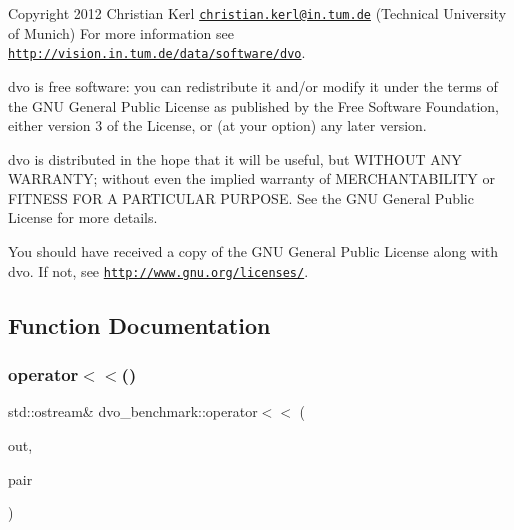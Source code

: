 Copyright 2012 Christian Kerl \href{mailto:christian.kerl@in.tum.de}{\tt christian.\+kerl@in.\+tum.\+de} (Technical University of Munich) For more information see \href{http://vision.in.tum.de/data/software/dvo}{\tt http\+://vision.\+in.\+tum.\+de/data/software/dvo}.

dvo is free software\+: you can redistribute it and/or modify it under the terms of the G\+NU General Public License as published by the Free Software Foundation, either version 3 of the License, or (at your option) any later version.

dvo is distributed in the hope that it will be useful, but W\+I\+T\+H\+O\+UT A\+NY W\+A\+R\+R\+A\+N\+TY; without even the implied warranty of M\+E\+R\+C\+H\+A\+N\+T\+A\+B\+I\+L\+I\+TY or F\+I\+T\+N\+E\+SS F\+OR A P\+A\+R\+T\+I\+C\+U\+L\+AR P\+U\+R\+P\+O\+SE. See the G\+NU General Public License for more details.

You should have received a copy of the G\+NU General Public License along with dvo. If not, see \href{http://www.gnu.org/licenses/}{\tt http\+://www.\+gnu.\+org/licenses/}. 

\subsection{Function Documentation}
\mbox{\label{namespacedvo__benchmark_a0cdc475ab077a0175cd964d248b532ed}} 
\subsubsection{\texorpdfstring{operator$<$$<$()}{operator<<()}\hspace{0.1cm}{\footnotesize\ttfamily [1/2]}}
{\footnotesize\ttfamily std\+::ostream\& dvo\+\_\+benchmark\+::operator$<$$<$ (\begin{DoxyParamCaption}\item[{std\+::ostream \&}]{out,  }\item[{const \mbox{\hyperlink{classdvo__benchmark_1_1_rgbd_pair}{Rgbd\+Pair}} \&}]{pair }\end{DoxyParamCaption})}

\mbox{\label{namespacedvo__benchmark_a0f344cbdf74589f265c2f5737bf6e8a7}} 
